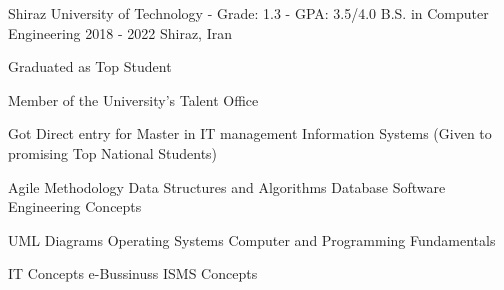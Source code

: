 \begin{cventries}

\cventry
  {Shiraz University of Technology - Grade: 1.3 - GPA: 3.5/4.0} %
  {B.S. in Computer Engineering} %
  {2018 - 2022} %
  {Shiraz, Iran} %
  {
    \begin{cvitems}
      \item {Graduated as Top Student} 
      \item {Member of the University's Talent Office} 
      \item {Got Direct entry for Master in IT management Information Systems (Given to promising Top National Students)}
    \end{cvitems}
    \vspace{5mm}
    \vspace{5mm}
    \begin{cvitems}
      \item {
        {Agile Methodology}
        \mitdiv
        {Data Structures and Algorithms} 
        \mitdiv 
        {Database}
        \mitdiv
        {Software Engineering Concepts}
      } 
      \item {
        {UML Diagrams}
        \mitdiv
        {Operating Systems}
        \mitdiv
        {Computer and Programming Fundamentals}
      } 
      \item {
        {IT Concepts}
        \mitdiv
        {e-Bussinuss}
        \mitdiv
        {ISMS Concepts}
      }
    \end{cvitems}
  }
\end{cventries}
